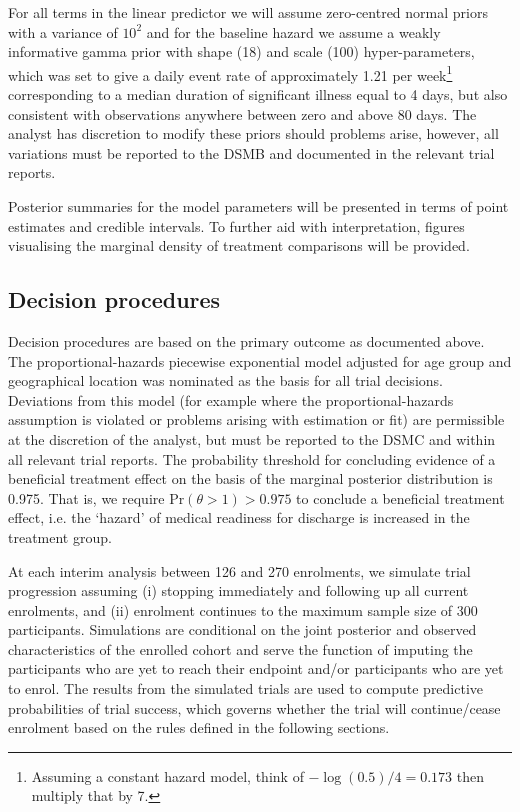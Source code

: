 \documentclass[a4paper]{article}
\begin{document}
For all terms in the linear predictor we will assume zero-centred normal priors with a variance of $10^2$ and for the baseline hazard we assume a weakly informative gamma prior with shape (18) and scale (100) hyper-parameters, which was set to give a daily event rate of approximately 1.21 per week\footnote{Assuming a constant hazard model, think of $-\log(0.5)/4 = 0.173$ then multiply that by 7.} corresponding to a median duration of significant illness equal to 4 days, but also consistent with observations anywhere between zero and above 80 days.
The analyst has discretion to modify these priors should problems arise, however, all variations must be reported to the DSMB and documented in the relevant trial reports.

Posterior summaries for the model parameters will be presented in terms of point estimates and credible intervals.
To further aid with interpretation, figures visualising the marginal density of treatment comparisons will be provided.

\subsection{Decision procedures}

Decision procedures are based on the primary outcome as documented above.
The proportional-hazards piecewise exponential model adjusted for age group and geographical location was nominated as the basis for all trial decisions.
Deviations from this model (for example where the proportional-hazards assumption is violated or problems arising with  estimation or fit) are permissible at the discretion of the analyst, but must be reported to the DSMC and within all relevant trial reports.
The probability threshold for concluding evidence of a beneficial treatment effect on the basis of the marginal posterior distribution is 0.975.
That is, we require $\text{Pr}(\theta > 1) > 0.975$ to conclude a beneficial treatment effect, i.e. the `hazard' of medical readiness for discharge is increased in the treatment group.

At each interim analysis between 126 and 270 enrolments, we simulate trial progression assuming (i) stopping immediately and following up all current enrolments, and (ii) enrolment continues to the maximum sample size of 300 participants.
Simulations are conditional on the joint posterior and observed characteristics of the enrolled cohort and serve the function of imputing the participants who are yet to reach their endpoint and/or participants who are yet to enrol.
The results from the simulated trials are used to compute predictive probabilities of trial success, which governs whether the trial will continue/cease enrolment based on the rules defined in the following sections.
\end{document}
